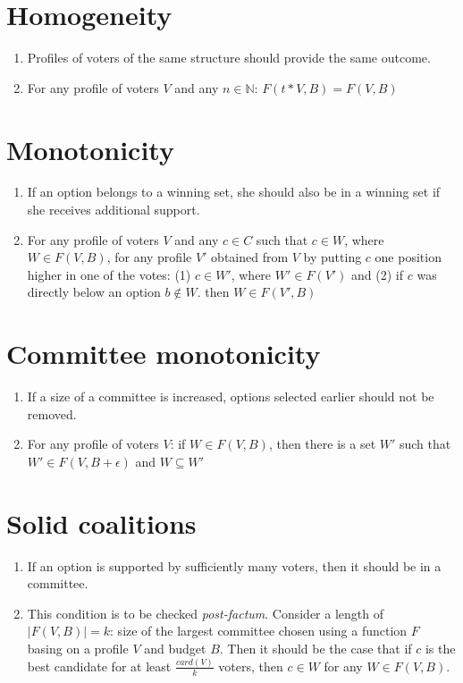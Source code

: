 \documentclass{article}
\begin{document}
\section{Homogeneity}
\begin{enumerate}
\item Profiles of voters of the same structure should provide the same outcome.
\item For any profile of voters $V$ and any $n \in \mathbb{N}$: $F(t*V, B)=F(V, B)$
\end{enumerate}

\section{Monotonicity}
\begin{enumerate}
\item If an option belongs to a winning set, she should also be in a winning set if she receives additional support.
\item For any profile of voters $V$ and any $c \in C$ such that $c \in W$, where $W \in F(V, B)$, for any profile $V'$ obtained from $V$ by putting $c$ one position higher in one of the votes: (1) $c \in W'$, where $W' \in F(V')$ and (2) if $c$ was directly below an option $b \notin W$. then $W \in F(V', B)$
\end{enumerate}

\section{Committee monotonicity}
\begin{enumerate}
\item If a size of a committee is increased, options selected earlier should not be removed.
\item For any profile of voters $V$: if $W \in F(V, B)$, then there is a set $W'$ such that $W' \in F(V, B + \epsilon)$ and $W \subseteq W'$ 
\end{enumerate}

\section{Solid coalitions}
\begin{enumerate}
\item If an option is supported by sufficiently many voters, then it should be in a committee.
\item This condition is to be checked \textit{post-factum}. Consider a length of $|F(V, B)|=k$: size of the largest committee chosen using a function $F$ basing on a profile $V$ and budget $B$. Then it should be the case that if $c$ is the best candidate for at least $\frac{card(V)}{k}$ voters, then $c \in W$ for any $W \in F(V, B)$.
\end{enumerate}
\end{document}
